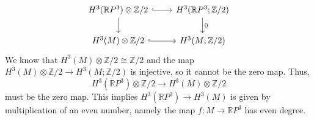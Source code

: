 \documentclass[letterpaper, 12pt]{article}
\begin{document}
\begin{solution}
\begin{enumerate}[(a)]
\[\begin{tikzcd}
	{H^3(\mathbb{R}P^3)\otimes \mathbb{Z}/2} & {H^3(\mathbb{R}P^3;\mathbb{Z}/2)} \\
	{H^3(M)\otimes\mathbb{Z}/2} & {H^3(M;\mathbb{Z}/2)}
	\arrow[hook, from=1-1, to=1-2]
	\arrow[from=1-1, to=2-1]
	\arrow["0", from=1-2, to=2-2]
	\arrow[hook, from=2-1, to=2-2]
\end{tikzcd}\]
We know that \(H^3(M)\otimes \mathbb{Z}/2\cong \mathbb{Z}/2\) and the map \(H^3(M)\otimes \mathbb{Z}/2\rightarrow H^3(M;\mathbb{Z}/2)\) is injective, so it cannot be the zero map. Thus, 
\[H^3(\mathbb{R}P^3)\otimes \mathbb{Z}/2\rightarrow H^3(M)\otimes \mathbb{Z}/2\]
must be the zero map. This implies \(H^3(\mathbb{R}P^3)\rightarrow H^3(M)\) is given by multiplication of an even number, namely the map \(f:M\rightarrow \mathbb{R}P^3\) has even degree.
\end{enumerate}
\end{solution}
\end{document}
